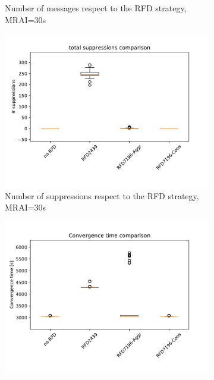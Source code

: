 \begin{figure}[H]
\begin{subfigure}[b]{0.325\textwidth}
         \caption{Number of messages respect to the RFD strategy, MRAI=30s}
         \label{fig:1000_RFD_MRAI30_messages_mice}
     \end{subfigure}
     \hfill
     \begin{subfigure}[b]{0.325\textwidth}
         \centering
         \includegraphics[width=\textwidth]{images/RFD/miceVSelephants/MultiMRAI/30/mice/cisco_1000MRAI30_rfd_comparison_suppressions_boxplot.pdf}
         \caption{Number of suppressions respect to the RFD strategy, MRAI=30s}
         \label{fig:1000_RFD_MRAI30_suppressions_mice}
     \end{subfigure}
     \vfill
     \begin{subfigure}[b]{0.325\textwidth}
         \centering
         \includegraphics[width=\textwidth]{images/RFD/miceVSelephants/MultiMRAI/45/mice/cisco_1000MRAI45_rfd_comparison_time_boxplot.pdf}

\end{subfigure}
\end{figure}
